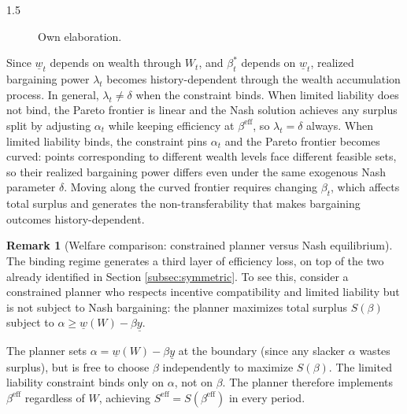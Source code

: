 \documentclass[12pt]{article}
\theoremstyle{definition}
\newtheorem{remark}{Remark}[section]
\theoremstyle{plain}
\begin{document}
\begin{spacing}{1.5}
\begin{figure}[htbp]
\caption*{ Own elaboration.}
\label{fig:ntu_frontier}
\end{figure}

Since $\underline{w}_t$ depends on wealth through $W_t$, and $\beta_t^*$ depends on $\underline{w}_t$, realized bargaining power $\lambda_t$ becomes history-dependent through the wealth accumulation process. In general, $\lambda_t \neq \delta$ when the constraint binds. When limited liability does not bind, the Pareto frontier is linear and the Nash solution achieves any surplus split by adjusting $\alpha_t$ while keeping efficiency at $\beta^{\text{eff}}$, so $\lambda_t = \delta$ always. When limited liability binds, the constraint pins $\alpha_t$ and the Pareto frontier becomes curved: points corresponding to different wealth levels face different feasible sets, so their realized bargaining power differs even under the same exogenous Nash parameter $\delta$. Moving along the curved frontier requires changing $\beta_t$, which affects total surplus and generates the non-transferability that makes bargaining outcomes history-dependent.

\begin{remark}[Welfare comparison: constrained planner versus Nash equilibrium]\label{rem:welfare}
The binding regime generates a third layer of efficiency loss, on top of the two already identified in Section \ref{subsec:symmetric}. To see this, consider a constrained planner who respects incentive compatibility and limited liability but is not subject to Nash bargaining: the planner maximizes total surplus $S(\beta)$ subject to $\alpha \geq \underline{w}(W) - \beta\underline{y}$.

The planner sets $\alpha = \underline{w}(W) - \beta\underline{y}$ at the boundary (since any slacker $\alpha$ wastes surplus), but is free to choose $\beta$ independently to maximize $S(\beta)$. The limited liability constraint binds only on $\alpha$, not on $\beta$. The planner therefore implements $\beta^{\mathrm{eff}}$ regardless of $W$, achieving $S^{\mathrm{eff}} = S(\beta^{\mathrm{eff}})$ in every period.


\end{remark}
\end{spacing}
\end{document}
